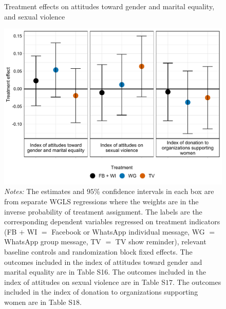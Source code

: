 \documentclass[12pt]{article}
\begin{document}
\begin{figure}[H]
    \centering
    \caption{Treatment effects on attitudes toward gender and marital equality, and sexual violence}
    \includegraphics[width=12cm, height=9cm\textwidth]{Figures/RF-FS/Figure3.pdf}
        \captionsetup{width=.75\linewidth}
    \caption*{\footnotesize \textit{Notes:} The estimates and $95$\% confidence intervals in each box are from separate WGLS regressions where the weights are in the inverse probability of treatment assignment. The labels are the corresponding dependent variables regressed on treatment indicators (FB $+$ WI $=$ Facebook or WhatsApp individual message, WG $=$ WhatsApp group message, TV $=$ TV show reminder), relevant baseline controls and randomization block fixed effects. The outcomes included in the index of attitudes toward gender and marital equality are in Table S16. The outcomes included in the index of attitudes on sexual violence are in Table S$17$. The outcomes included in the index of donation to organizations supporting women are in Table S$18$.}
\end{figure}
\end{document}
